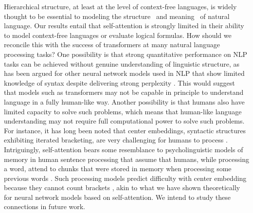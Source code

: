 \documentclass[11pt,a4paper]{article}
\begin{document}

Hierarchical structure, at least at the level of context-free languages, is widely thought to be essential to modeling the structure~\cite{everaert2015structures} and meaning~\cite{montague1973proper} of natural language.
Our results entail that self-attention is strongly limited in their ability to model context-free languages or evaluate logical formulas.
How should we reconcile this with the success of transformers at many natural language processing tasks?
One possibility is that strong quantitative performance on NLP tasks can be achieved without genuine understanding of linguistic structure, as has been argued for other neural network models used in NLP that show limited knowledge of syntax despite delivering strong perplexity  \cite{linzen2016assessing,marvin2018targeted}.
This would suggest that models such as transformers may not be capable in principle to understand language in a fully human-like way.
Another possibility is that humans also have limited capacity to solve such problems, which means that human-like language understanding may not require full computational power to solve such problems.
For instance, it has long been noted that center embeddings, syntactic structures exhibiting iterated bracketing, are very challenging for humans to process \cite{miller-finitary-1963,gibson1999memory}.
Intriguingly, self-attention bears some resemblance to psycholinguistic models of memory in human sentence processing that assume that humans, while processing a word, attend to chunks that were stored in memory when processing some previous words \cite{lewis2005activation,parker2017cue}.
Such processing models predict difficulty with center embedding because they cannot count brackets \cite{lewis2005activation}, akin to what we have shown theoretically for neural network models based on self-attention.
We intend to study these connections in future work.
\end{document}
